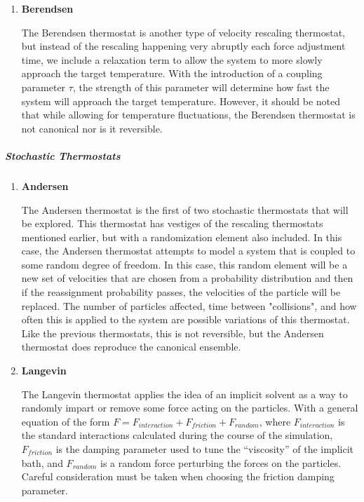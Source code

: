 \documentclass[9pt,bestpractices]{livecoms}
\begin{document}
\begin{enumerate}[listparindent=\parindent]
    \item \textbf{Berendsen}

        The Berendsen thermostat is another type of velocity rescaling thermostat, but instead of the rescaling happening
        very abruptly each force adjustment time, we include a relaxation term to allow the system to more slowly approach the target
        temperature\cite{berendsen1984molecular}.
        With the introduction of a coupling parameter $\tau$, the strength of this parameter will determine
        how fast the system will approach the target temperature.
        However, it should be noted that while allowing for temperature fluctuations, the Berendsen thermostat is not canonical nor is it reversible.

\end{enumerate}

\subparagraph{Stochastic Thermostats}
\begin{enumerate}[listparindent=\parindent]
    \item \textbf{Andersen}

        The Andersen\cite{andersen1980molecular} thermostat is the first of two stochastic thermostats that will be explored.
        This thermostat has vestiges of the rescaling thermostats mentioned earlier, but with a randomization element also included.
        In this case, the Andersen thermostat attempts to model a system that is coupled to some random
        degree of freedom\cite{andersen1980molecular, thermostatAlgorithms2005}.
        In this case, this random element will be a new set of velocities that are chosen from a probability distribution and then if the reassignment probability passes, the velocities of the particle will be replaced.
        The number of particles affected, time between "collisions", and how often this is applied to the system are possible variations of this thermostat.
        Like the previous thermostats, this is not reversible, but the Andersen thermostat does reproduce the canonical ensemble.
    
    \item \textbf{Langevin}

        The Langevin\cite{schneider1978molecular} thermostat applies the idea of an implicit solvent as a way to randomly impart or remove some force acting on the particles. 
        With a general equation of the form $F = F_{interaction} + F_{friction} + F_{random}$, where $F_{interaction}$ is the standard interactions calculated during the course of the simulation, $F_{friction}$ is the damping parameter used to tune the  ``viscosity'' of the implicit bath, and $F_{random}$ is a random force perturbing the forces on the particles. 
        Careful consideration must be taken when choosing the friction damping parameter.


\end{enumerate}
\end{document}
